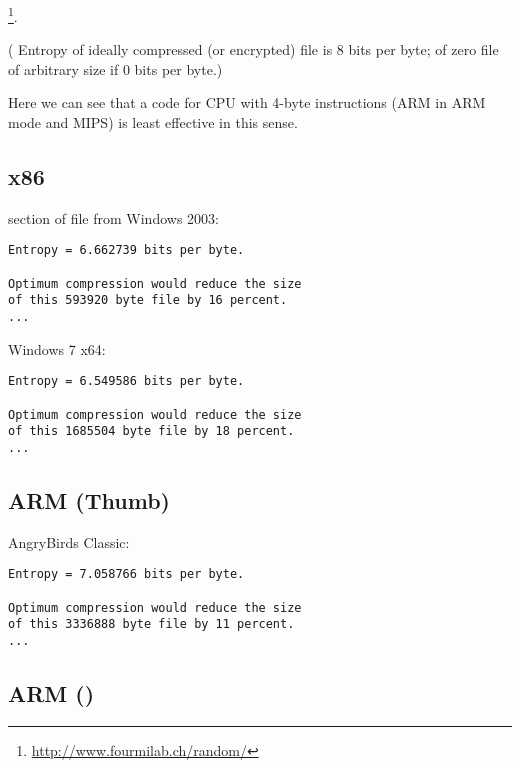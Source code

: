 \footnote{\url{http://www.fourmilab.ch/random/}}.

(
{Entropy of ideally compressed (or encrypted) file is 8 bits per byte; of zero file of arbitrary size if 0 bits per byte.})

{Here we can see that a code for CPU with 4-byte instructions (ARM in ARM mode and MIPS) is least effective in this sense.}

\subsection{x86}

{ section of  file from} Windows 2003:

\begin{lstlisting}
Entropy = 6.662739 bits per byte.

Optimum compression would reduce the size
of this 593920 byte file by 16 percent.
...
\end{lstlisting}

   Windows 7 x64:

\begin{lstlisting}
Entropy = 6.549586 bits per byte.

Optimum compression would reduce the size
of this 1685504 byte file by 18 percent.
...
\end{lstlisting}

\subsection{ARM (Thumb)}

AngryBirds Classic:

\begin{lstlisting}
Entropy = 7.058766 bits per byte.

Optimum compression would reduce the size
of this 3336888 byte file by 11 percent.
...
\end{lstlisting}

\subsection{ARM ()}

